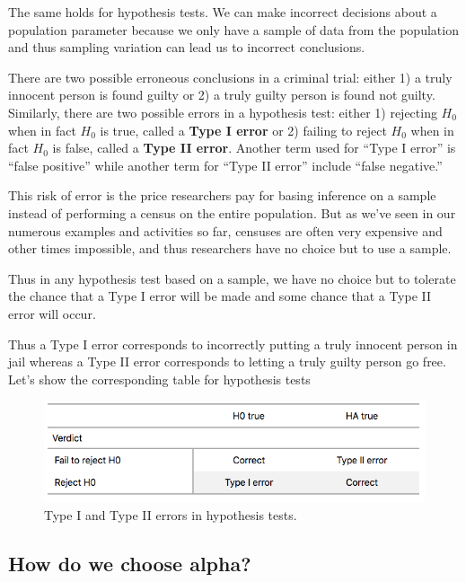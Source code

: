 \documentclass[
]{book}
\begin{document}
The same holds for hypothesis tests. We can make incorrect decisions about a population parameter because we only have a sample of data from the population and thus sampling variation can lead us to incorrect conclusions.

There are two possible erroneous conclusions in a criminal trial: either 1) a truly innocent person is found guilty or 2) a truly guilty person is found not guilty. Similarly, there are two possible errors in a hypothesis test: either 1) rejecting \(H_0\) when in fact \(H_0\) is true, called a \textbf{Type I error}  or 2) failing to reject \(H_0\) when in fact \(H_0\) is false, called a  \textbf{Type II error}. Another term used for ``Type I error'' is ``false positive'' while another term for ``Type II error'' include ``false negative.''

This risk of error is the price researchers pay for basing inference on a sample instead of performing a census on the entire population. But as we've seen in our numerous examples and activities so far, censuses are often very expensive and other times impossible, and thus researchers have no choice but to use a sample.

Thus in any hypothesis test based on a sample, we have no choice but to tolerate the chance that a Type I error will be made and some chance that a Type II error will occur.

Thus a Type I error corresponds to incorrectly putting a truly innocent person in jail whereas a Type II error corresponds to letting a truly guilty person go free. Let's show the corresponding table for hypothesis tests

\begin{figure}
\includegraphics[width=0.9\linewidth]{images/gt_error_table_ht} \caption{Type I and Type II errors in hypothesis tests.}\label{fig:trial-errors-table-ht}
\end{figure}

\hypertarget{choosing-alpha}{%
\subsection{How do we choose alpha?}\label{choosing-alpha}}
\end{document}
